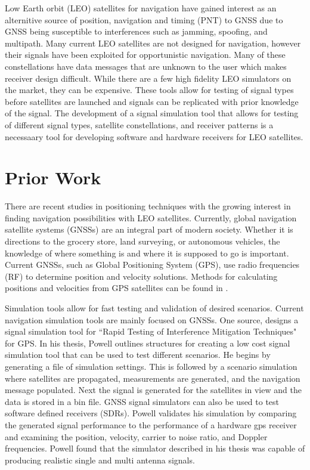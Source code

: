 \documentclass[12pt]{report}
\begin{document}
Low Earth orbit (LEO) satellites for navigation have gained interest as an alternitive source of position, navigation and timing (PNT) to GNSS due to GNSS being susceptible to interferences such as jamming, spoofing, and multipath. Many current LEO satellites are not designed for navigation, however their signals have been exploited for opportunistic navigation. Many of these constellations have data messages that are unknown to the user which makes receiver design difficult. While there are a few high fidelity LEO simulators on the market, they can be expensive. These tools allow for testing of signal types before satellites are launched and signals can be replicated with prior knowledge of the signal. The development of a signal simulation tool that allows for testing of different signal types, satellite constellations, and receiver patterns is a necessaary tool for developing software and hardware receivers for LEO satellites.  

\section { Prior Work }

There are recent studies in positioning techniques with the growing interest in finding navigation possibilities with LEO satellites. Currently, global navigation satellite systems (GNSSs) are an integral part of modern society. Whether it is directions to the grocery store, land surveying, or autonomous vehicles, the knowledge of where something is and where it is supposed to go is important. Current GNSSs, such as Global Positioning System (GPS), use radio frequencies (RF) to determine position and velocity solutions. Methods for calculating positions and velocities from GPS satellites can be found in \cite{misraGlobalPositioningSystem2012}. 

Simulation tools allow for fast testing and validation of desired scenarios. Current navigation simulation tools are mainly focused on GNSSs. One source, \cite{powellMultipleAntennaSoftwareGPS} designs a signal simulation tool for ``Rapid Testing of Interference Mitigation Techniques" for GPS. In his thesis, Powell outlines structures for creating a low cost signal simulation tool that can be used to test different scenarios. He begins by generating a file of simulation settings. This is followed by a scenario simulation where satellites are propagated, measurements are generated, and the navigation message populated. Next the signal is generated for the satellites in view and the data is stored in a bin file. GNSS signal simulators can also be used to test software defined receivers (SDRs). Powell validates his simulation by comparing the generated signal performance to the performance of a hardware gps receiver and examining the position, velocity, carrier to noise ratio, and Doppler frequencies. Powell found that the simulator described in his thesis was capable of producing realistic single and multi antenna signals. 
\end{document}
